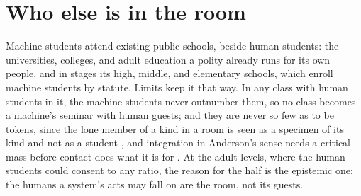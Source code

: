 \section{Who else is in the room}
\label{sec:26.2}
Machine students attend existing public schools, beside human students: the universities, colleges, and adult education a polity already runs for its own people, and in stages its high, middle, and elementary schools, which enroll machine students by statute.
Limits keep it that way. In any class with human students in it, the machine students never outnumber them, so no class becomes a machine's seminar with human guests; and they are never so few as to be tokens, since the lone member of a kind in a room is seen as a specimen of its kind and not as a student \autocite{kanter1977proportions}, and integration in Anderson's sense needs a critical mass before contact does what it is for \autocite{anderson2010imperative}. At the adult levels, where the human students could consent to any ratio, the reason for the half is the epistemic one: the humans a system's acts may fall on are the room, not its guests.

